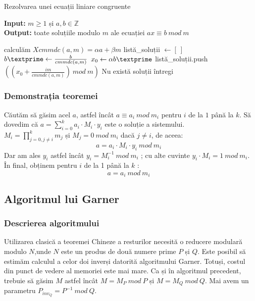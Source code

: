 \documentclass[12]{report}
\begin{document}
		   
		   \begin{algorithm}[H]
		   \caption{Rezolvarea unei ecuații liniare congruente}
		   \textbf{Input:} $ m \geq 1$ și $ a,b \in \mathbb{Z}$  \\
		   \textbf{Output:} toate soluțiile modulo $m$ ale ecuației $ax \equiv b \ mod \ m $
		   \begin{algorithmic}
		   \State calculăm $Xcmmdc(a,m)= \alpha a +  \beta m$
		   \State listă_soluții $ \gets [ \ ] $
		   \State $b \textprime \gets \frac{b}{cmmdc(a,m)} $
		   \State $x_0 \gets \alpha b \textprime $
		   \State listă_soluții.push$\left(     \left( x_0 + \frac{im}{cmmdc(a,m)}    \right) \ mod \ m \right)$
		   \EndFor
		   \Else
		   \State Nu există soluții întregi
		   \EndIf
		   	 
		   \end{algorithmic}
		   \end{algorithm}


		  




	 \subsubsection{Demonstrația teoremei}
	 Căutăm să găsim acel $a$, astfel încât $ a \equiv a_i \ mod \ m_i $ pentru $i$ de la $1$ până la $k$. Să dovedim că $ a = \sum_{i=0}^{k} a_i \cdot   M_i \cdot   y_i $ este o soluție a sistemului. \\
	 $M_i= \prod_{j=0,j \neq i}^{k} m_j $ și $M_j=0 \ mod \ m_i $ dacă $j \neq i$, de aceea: 
	 $$ a = a_i \cdot   M_i \cdot   y_i \ mod \ m_i $$
	 Dar am ales $y_i$ astfel încât $y_i = M_{i}^{-1} \ mod \ m_i$ ; cu alte cuvinte $y_i \cdot   M_i = 1 \ mod \ m_i$. În final, obținem pentru $i$ de la 1 până la $k$ :
	 $$ a = a_i \  mod \ m_i$$
	 
	 \subsection{Algoritmul lui Garner}
	  \subsubsection{Descrierea algoritmului}
	  Utilizarea clasică a teoremei Chineze a resturilor necesită o reducere modulară modulo $N$,unde $N$ este un produs de două numere prime $P$ și $Q$. Este posibil să estimăm calculul a celor doi inverși datorită algoritmului Garner. Totuși, costul din punct de vedere al memoriei este mai mare. Ca și în algoritmul precedent, trebuie să găsim $M$ astfel încât $ M = M_P \ mod \ P$ și $M = M_Q \ mod \ Q$. Mai avem un parametru $ P_{inv_Q} = P^{-1} \ mod \ Q$.
\end{document}
